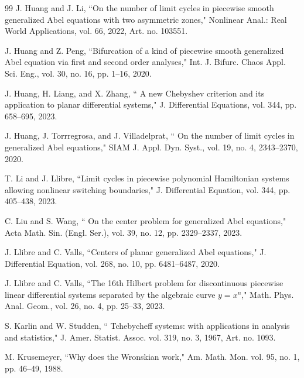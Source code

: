 \documentclass[11pt]{amsart}
\theoremstyle{remark}
\theoremstyle{definition}
\begin{document}
\begin{thebibliography}{99}
 J. Huang and  J. Li,   ``On the number of limit cycles in piecewise smooth generalized Abel
equations with two asymmetric zones,"  Nonlinear
Anal.: Real World Applications,  vol.  66,  2022, Art. no.  103551.



 J. Huang and  Z. Peng,  ``Bifurcation of a kind of piecewise smooth generalized Abel equation via first and second order analyses," Int. J. Bifurc. Chaos
Appl. Sci. Eng., vol. 30, no. 16,   pp. 1--16,   2020.


 J. Huang, H. Liang, and X. Zhang,   `` A new Chebyshev criterion and its application to planar
differential systems," J. Differential Equations, vol.  344, pp. 658--695,  2023.


 J.  Huang, J. Torrregrosa, and J. Villadelprat,  `` On the number of limit cycles in generalized Abel equations,"
 SIAM J. Appl. Dyn. Syst.,  vol.  19, no. 4,  2343--2370,  2020.



 T. Li and   J. Llibre,  ``Limit cycles in piecewise polynomial Hamiltonian systems allowing nonlinear switching boundaries," J. Differential Equation, vol.  344,   pp. 405--438,  2023.


 C. Liu and  S. Wang,  `` On the center problem for generalized Abel equations,"  Acta Math. Sin. (Engl. Ser.), vol.  39, no. 12, pp. 2329--2337,   2023.





 J. Llibre and   C. Valls,    ``Centers of planar generalized Abel equations,"  J. Differential Equation,  vol.  268,  no. 10,   pp. 6481--6487, 2020.


 J.  Llibre and C.  Valls,   ``The 16th Hilbert problem for discontinuous piecewise linear differential systems separated by the algebraic curve $y=x^n$," Math. Phys. Anal. Geom.,  vol.  26, no. 4,  pp. 25--33,    2023.



  S. Karlin and  W. Studden,  `` Tchebycheff systems: with applications  in analysis and statistics," J. Amer. Statist. Assoc.
   vol.  319, no. 3,    1967, Art. no.   1093.




  M. Krusemeyer,   ``Why does the Wronskian work," Am. Math. Mon.  vol. 95, no. 1,   pp. 46--49,  1988.








\end{thebibliography}
\end{document}
